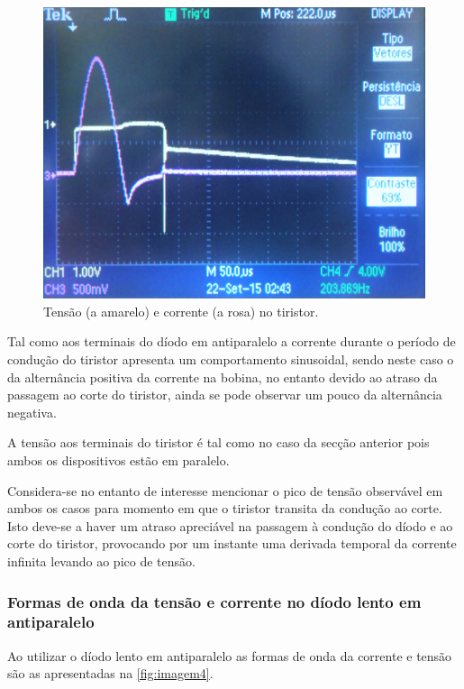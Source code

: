 \documentclass[a4paper,11pt]{article}
\numberwithin{equation}{section}
\begin{document}
\begin{figure}[h]
	\centering
	\includegraphics[keepaspectratio=true, scale=0.12]{img/imagem3}
	\caption{Tensão (a amarelo) e corrente (a rosa) no tiristor.}
	\label{fig:imagem3}
	\vspace{-0.8em}
\end{figure}

\pagebreak

Tal como aos terminais do díodo em antiparalelo a corrente durante o período de condução do tiristor apresenta um comportamento sinusoidal, sendo neste caso o da alternância positiva da corrente na bobina, no entanto devido ao atraso da passagem ao corte do tiristor, ainda se pode observar um pouco da alternância negativa.

A tensão aos terminais do tiristor é tal como no caso da secção anterior pois ambos os dispositivos estão em paralelo.

Considera-se no entanto de interesse mencionar o pico de tensão observável em ambos os casos para momento em que o tiristor transita da condução ao corte. Isto deve-se a haver um atraso apreciável na passagem à condução do díodo e ao corte do tiristor, provocando por um instante uma derivada temporal da corrente infinita levando ao pico de tensão.


\subsubsection{Formas de onda da tensão e corrente no díodo lento em antiparalelo}

Ao utilizar o díodo lento em antiparalelo as formas de onda da corrente e tensão são as apresentadas na \autoref{fig:imagem4}.
\end{document}
